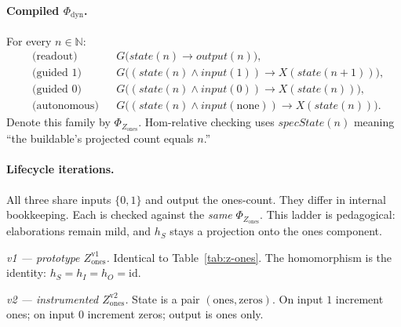 \paragraph{Compiled $\Phi_{\mathrm{dyn}}$.}
For every $n\in\mathbb{N}$:
\begin{align*}
  &\text{(readout)} && G\bigl(\mathit{state}(n) \rightarrow \mathit{output}(n)\bigr), \\
  &\text{(guided $1$)} && G\bigl((\mathit{state}(n)\wedge\mathit{input}(1)) \rightarrow X(\mathit{state}(n{+}1))\bigr), \\
  &\text{(guided $0$)} && G\bigl((\mathit{state}(n)\wedge\mathit{input}(0)) \rightarrow X(\mathit{state}(n))\bigr), \\
  &\text{(autonomous)} && G\bigl((\mathit{state}(n)\wedge\mathit{input}(\mathrm{none})) \rightarrow X(\mathit{state}(n))\bigr).
\end{align*}
Denote this family by $\Phi_{Z_{\mathrm{ones}}}$. Hom-relative checking uses $\mathit{specState}(n)$ meaning ``the buildable's projected count equals $n$.''

\paragraph{Lifecycle iterations.}
All three share inputs $\{0,1\}$ and output the ones-count. They differ in internal bookkeeping. Each is checked against the \emph{same} $\Phi_{Z_{\mathrm{ones}}}$. This ladder is pedagogical: elaborations remain mild, and $h_S$ stays a projection onto the ones component.

\textit{v1 --- prototype $Z_{\mathrm{ones}}^{\mathrm{v1}}$.}
Identical to Table~\ref{tab:z-ones}. The homomorphism is the identity: $h_S=h_I=h_O=\mathrm{id}$.

\textit{v2 --- instrumented $Z_{\mathrm{ones}}^{\mathrm{v2}}$.}
State is a pair $(\mathrm{ones},\mathrm{zeros})$. On input $1$ increment ones; on input $0$ increment zeros; output is ones only.

